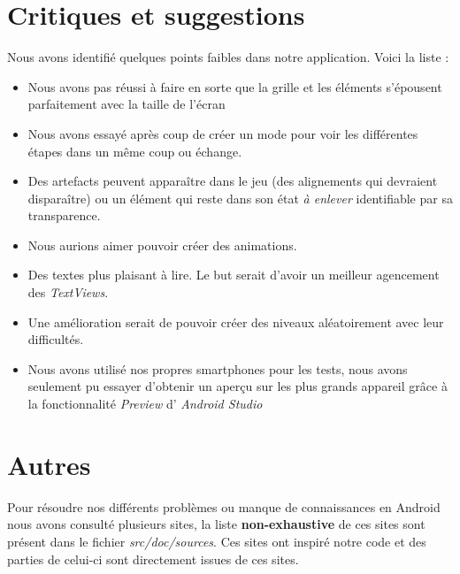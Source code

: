 \section{Critiques et suggestions}
Nous avons identifié quelques points faibles dans notre application. Voici la liste : 
\begin{itemize}
\item Nous avons pas réussi à faire en sorte que la grille et les éléments s'épousent parfaitement avec la taille de l'écran
\item Nous avons essayé après coup de créer un mode pour voir les différentes étapes dans un même coup ou échange.  
\item Des artefacts peuvent apparaître dans le jeu (des alignements qui devraient disparaître) ou un élément qui reste dans son état \textit{à enlever} identifiable par sa transparence.
\item Nous aurions aimer pouvoir créer des animations.
\item Des textes plus plaisant à lire. Le but serait d'avoir un meilleur agencement des \textit{TextViews}.
\item Une amélioration serait de pouvoir créer des niveaux aléatoirement avec leur difficultés. 
\item Nous avons utilisé nos propres smartphones pour les tests, nous avons seulement pu essayer d'obtenir un aperçu sur les plus grands appareil grâce à la fonctionnalité \textit{Preview} d' \textit{Android Studio} 
\end{itemize}

\section{Autres}
Pour résoudre nos différents problèmes ou manque de connaissances en Android nous avons consulté plusieurs sites, la liste \textbf{non-exhaustive} de ces sites sont présent dans le fichier \textit{src/doc/sources}. Ces sites ont inspiré notre code et des parties de celui-ci sont directement issues de ces sites.
